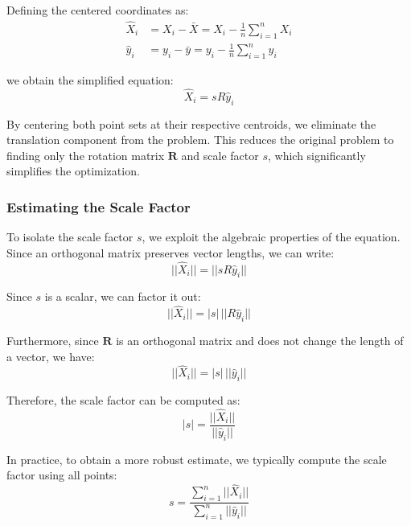 \documentclass[11pt,a4paper]{article}
\theoremstyle{definition}
\theoremstyle{plain}
\theoremstyle{remark}
\begin{document}
Defining the centered coordinates as:
\begin{align}
    \hat{X}_i &= X_i - \bar{X} = X_i - \frac{1}{n}\sum_{i=1}^{n} X_i \nonumber \\
    \hat{y}_i &= y_i - \bar{y} = y_i - \frac{1}{n}\sum_{i=1}^{n} y_i \nonumber
\end{align}

we obtain the simplified equation:
\begin{equation} \nonumber
    \hat{X}_i = s R \hat{y}_i
\end{equation}

\begin{tcolorbox}[colback=green!5!white,colframe=green!75!black,title=\textbf{Centered Coordinates}]
By centering both point sets at their respective centroids, we eliminate the translation component from the problem. This reduces the original problem to finding only the rotation matrix $\mathbf{R}$ and scale factor $s$, which significantly simplifies the optimization.
\end{tcolorbox}

\subsubsection{Estimating the Scale Factor}\label{subsubsec:estimating_scale}

To isolate the scale factor $s$, we exploit the algebraic properties of the equation. Since an orthogonal matrix preserves vector lengths, we can write:
\begin{equation} \nonumber
    ||\hat{X}_i|| = ||s R \hat{y}_i||
\end{equation}

Since $s$ is a scalar, we can factor it out:
\begin{equation} \nonumber
    ||\hat{X}_i|| = |s| \, ||R \hat{y}_i||
\end{equation}

Furthermore, since $\mathbf{R}$ is an orthogonal matrix and does not change the length of a vector, we have:
\begin{equation} \nonumber
    ||\hat{X}_i|| = |s| \, ||\hat{y}_i||
\end{equation}

Therefore, the scale factor can be computed as:
\begin{equation} \nonumber
    |s| = \frac{||\hat{X}_i||}{||\hat{y}_i||}
\end{equation}

In practice, to obtain a more robust estimate, we typically compute the scale factor using all points:
\begin{equation} \nonumber
    s = \frac{\sum_{i=1}^{n} ||\hat{X}_i||}{\sum_{i=1}^{n} ||\hat{y}_i||}
\end{equation}
\end{document}
